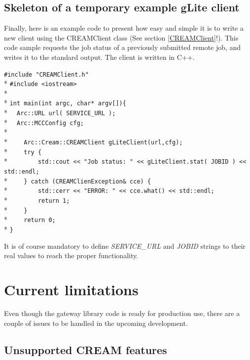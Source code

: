 \documentclass{article}
\begin{document}
\subsection{Skeleton of a temporary example gLite client}
Finally, here is an example code to present how easy and simple it is to write a new client using the CREAMClient class (See section \ref{CREAMClient}!). This code sample requests the job status of a previously submitted remote job, and writes it to the standard output. The client is written in C++.
\begin{framed}
\verb?#include "CREAMClient.h"?\\*
\verb?#include <iostream>?\\*
\\*
\verb?int main(int argc, char* argv[]){?\\*
\verb?  Arc::URL url( SERVICE_URL );?\\*
\verb?  Arc::MCCConfig cfg;?\\*
\\*
\verb?    Arc::Cream::CREAMClient gLiteClient(url,cfg);?\\*
\verb?    try {?\\*
\verb?        std::cout << "Job status: " << gLiteClient.stat( JOBID ) << std::endl;?\\*
\verb?    } catch (CREAMClienException& cce) {?\\*
\verb?        std::cerr << "ERROR: " << cce.what() << std::endl;?\\*
\verb?        return 1;?\\*
\verb?    }?\\*
\verb?    return 0;?\\*
\verb?}?
\end{framed}
It is of course mandatory to define \textit{SERVICE\_URL} and \textit{JOBID} strings to their real values to reach the proper functionality.
\section{Current limitations}
\label{Current limitations}
Even though the gateway library code is ready for production use, there are a couple of issues to be handled in the upcoming development.
\subsection{Unsupported CREAM features}
\end{document}
